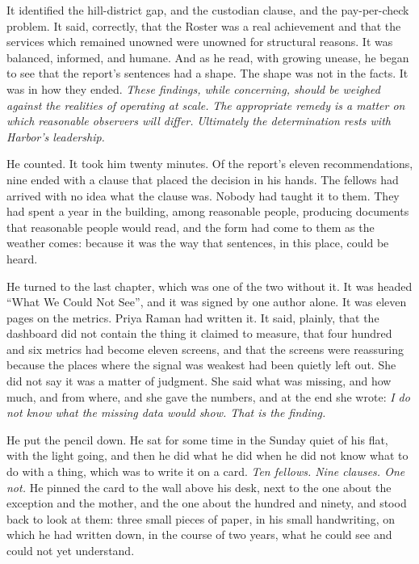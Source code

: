 It identified the hill-district gap, and the custodian clause, and the pay-per-check problem. It said, correctly, that the Roster was a real achievement and that the services which remained unowned were unowned for structural reasons. It was balanced, informed, and humane. And as he read, with growing unease, he began to see that the report's sentences had a shape. The shape was not in the facts. It was in how they ended. \emph{These findings, while concerning, should be weighed against the realities of operating at scale.} \emph{The appropriate remedy is a matter on which reasonable observers will differ.} \emph{Ultimately the determination rests with Harbor's leadership.}

He counted. It took him twenty minutes. Of the report's eleven recommendations, nine ended with a clause that placed the decision in his hands. The fellows had arrived with no idea what the clause was. Nobody had taught it to them. They had spent a year in the building, among reasonable people, producing documents that reasonable people would read, and the form had come to them as the weather comes: because it was the way that sentences, in this place, could be heard.

He turned to the last chapter, which was one of the two without it. It was headed ``What We Could Not See'', and it was signed by one author alone. It was eleven pages on the metrics. Priya Raman had written it. It said, plainly, that the dashboard did not contain the thing it claimed to measure, that four hundred and six metrics had become eleven screens, and that the screens were reassuring because the places where the signal was weakest had been quietly left out. She did not say it was a matter of judgment. She said what was missing, and how much, and from where, and she gave the numbers, and at the end she wrote: \emph{I do not know what the missing data would show. That is the finding.}

He put the pencil down. He sat for some time in the Sunday quiet of his flat, with the light going, and then he did what he did when he did not know what to do with a thing, which was to write it on a card. \emph{Ten fellows. Nine clauses. One not.} He pinned the card to the wall above his desk, next to the one about the exception and the mother, and the one about the hundred and ninety, and stood back to look at them: three small pieces of paper, in his small handwriting, on which he had written down, in the course of two years, what he could see and could not yet understand.

